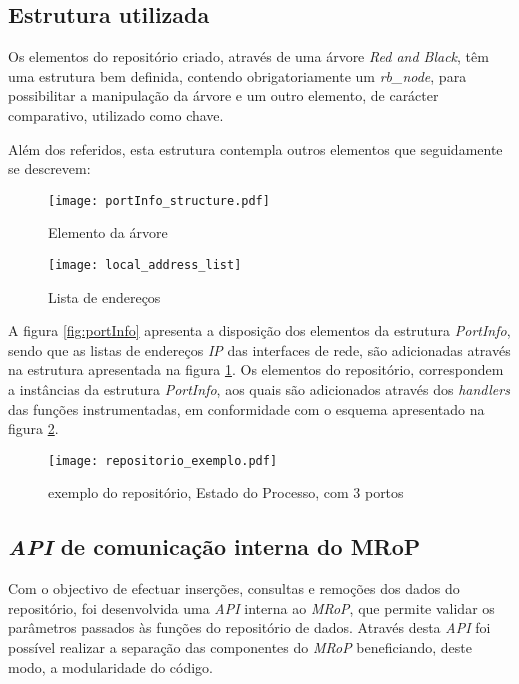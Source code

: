 \subsection{Estrutura utilizada}
\label{sub:repo_structure}

Os elementos do repositório criado, através de uma árvore \textit{Red and Black}, têm uma estrutura bem definida, contendo obrigatoriamente um \textit{rb\_node}, para possibilitar a manipulação da árvore e um outro elemento, de carácter comparativo, utilizado como chave.

Além dos referidos, esta estrutura contempla outros elementos que seguidamente se descrevem:

\begin{figure}[ht]
\begin{minipage}[b]{0.5\linewidth}
\centering
\texttt{[image: portInfo\_structure.pdf]}
\caption{Elemento da árvore}
\label{fig:portInfo}
\end{minipage}
\hspace{0.5cm}
\begin{minipage}[b]{0.5\linewidth}
\centering
\texttt{[image: local\_address\_list]}
\caption{Lista de endereços}
\label{fig:local_address_list}
\end{minipage}
\end{figure}

A figura \ref{fig:portInfo} apresenta a disposição dos elementos da estrutura \textit{PortInfo}, sendo que as listas de endereços \textit{IP} das interfaces de rede, são adicionadas através na estrutura apresentada na figura \ref{fig:local_address_list}.
Os elementos do repositório, correspondem a instâncias da estrutura \textit{PortInfo}, aos quais são adicionados através dos \textit{handlers} das funções instrumentadas, em conformidade com o esquema apresentado na figura \ref{fig:repo_example}.

\begin{figure}[ht]
\centering
\texttt{[image: repositorio\_exemplo.pdf]}
\caption{exemplo do repositório, Estado do Processo, com 3 portos}
\label{fig:repo_example}
\end{figure}

\subsection{\textit{API} de comunicação interna do MRoP}
\label{sub:repo_api}

Com o objectivo de efectuar inserções, consultas e remoções dos dados do repositório, foi desenvolvida uma \textit{API} interna ao \textit{MRoP}, que permite validar os parâmetros passados às funções do repositório de dados.
Através desta \textit{API} foi possível realizar a separação das componentes do \textit{MRoP} beneficiando, deste modo, a modularidade do código.

